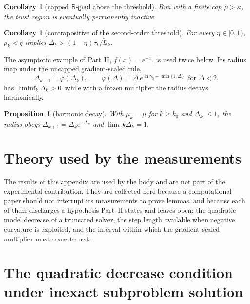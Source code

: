\documentclass[11pt]{article}
\theoremstyle{plain}
\newtheorem{proposition}[theorem]{Proposition}
\newtheorem{corollary}[theorem]{Corollary}
\theoremstyle{definition}
\theoremstyle{remark}
\numberwithin{equation}{section}
\newcommand{\Rgrad}{\textsf{R-grad}}
\providecommand{\kbar}{\overline{\kappa}}
\providecommand{\kbar}{\overline{\kappa}}
\begin{document}
\begin{corollary}[capped $\Rgrad$ above the threshold]
\label{thm: rgrad capped}
    Run with a finite cap $\overline{\mu} > \kbar$, the trust region is eventually
    permanently inactive.
\end{corollary}

\begin{corollary}[contrapositive of the second-order threshold]
\label{cor: successful iteration for low Delta (2nd order)}
    For every $\eta \in [0,1)$, $\rho_k < \eta$ implies
    $\Delta_k > (1-\eta)\tau_k / \widetilde L_k$.
\end{corollary}

The asymptotic example of Part~II, $f(x) = e^{-x}$, is used twice below. Its
radius map under the uncapped gradient-scaled rule,
\begin{equation}
    \Delta_{k+1} = \varphi(\Delta_k), \qquad
    \varphi(\Delta) = \Delta\,e^{\ln\gamma_3 - \min\{1,\Delta\}}
      \ \text{ for } \Delta < 2 ,
    \label{eqn:example grad map}
\end{equation}
has $\liminf_k \Delta_k > 0$, while with a frozen multiplier the radius decays
harmonically.

\begin{proposition}[harmonic decay]
\label{prop: example harmonic decay}
    With $\mu_k = \overline{\mu}$ for $k \geq k_0$ and $\Delta_{k_0} \leq 1$, the
    radius obeys $\Delta_{k+1} = \Delta_k e^{-\Delta_k}$ and
    $\lim_k k\Delta_k = 1$.
\end{proposition}

\section{Theory used by the measurements}
\label{app: theory}

The results of this appendix are used by the body and are not part of the
experimental contribution. They are collected here because a computational paper
should not interrupt its measurements to prove lemmas, and because each of them
discharges a hypothesis Part~II states and leaves open: the quadratic model
decrease of a truncated solver, the step length available when negative curvature
is exploited, and the interval within which the gradient-scaled multiplier must
come to rest.

\section{The quadratic decrease condition under inexact subproblem solution}
\label{sec: exp qdc}
\end{document}
